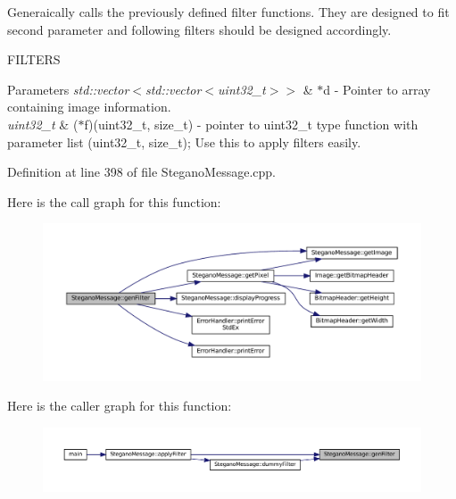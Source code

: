 Generaically calls the previously defined filter functions. They are designed to fit second parameter and following filters should be designed accordingly. 

F\+I\+L\+T\+E\+RS
\begin{DoxyParams}{Parameters}
{\em std\+::vector$<$std\+::vector$<$uint32\+\_\+t$>$$>$} & $\ast$d -\/ Pointer to array containing image information. \\
\hline
{\em uint32\+\_\+t} & ($\ast$f)(uint32\+\_\+t, size\+\_\+t) -\/ pointer to uint32\+\_\+t type function with parameter list (uint32\+\_\+t, size\+\_\+t); Use this to apply filters easily. \\
\hline
\end{DoxyParams}


Definition at line 398 of file Stegano\+Message.\+cpp.

Here is the call graph for this function\+:
\nopagebreak
\begin{figure}[H]
\begin{center}
\leavevmode
\includegraphics[width=350pt]{classSteganoMessage_a1cb326688e9a054127396d198bd6f976_cgraph}
\end{center}
\end{figure}
Here is the caller graph for this function\+:
\nopagebreak
\begin{figure}[H]
\begin{center}
\leavevmode
\includegraphics[width=350pt]{classSteganoMessage_a1cb326688e9a054127396d198bd6f976_icgraph}
\end{center}
\end{figure}
\mbox{\label{classSteganoMessage_a0134757a8c79caa9dca9bcce0686d1ef}} 
